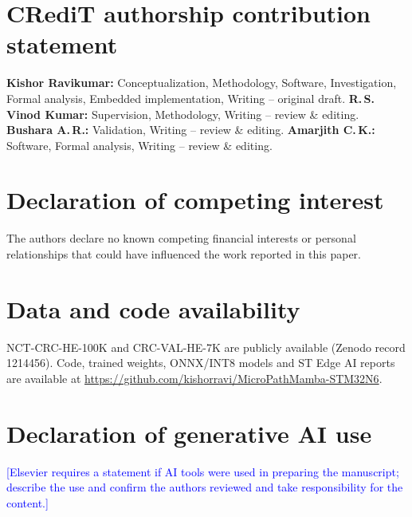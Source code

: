 \documentclass[preprint,12pt]{elsarticle}
\newcommand{\todo}[1]{\textcolor{blue}{[#1]}}
\begin{document}
\section*{CRediT authorship contribution statement}
\textbf{Kishor Ravikumar:} Conceptualization, Methodology, Software, Investigation, Formal analysis, Embedded implementation, Writing -- original draft. \textbf{R.\,S. Vinod Kumar:} Supervision, Methodology, Writing -- review \& editing. \textbf{Bushara A.\,R.:} Validation, Writing -- review \& editing. \textbf{Amarjith C.\,K.:} Software, Formal analysis, Writing -- review \& editing.

\section*{Declaration of competing interest}
The authors declare no known competing financial interests or personal relationships that could have influenced the work reported in this paper.

\section*{Data and code availability}
NCT-CRC-HE-100K and CRC-VAL-HE-7K are publicly available (Zenodo record 1214456). Code, trained weights, ONNX/INT8 models and ST Edge AI reports are available at \url{https://github.com/kishorravi/MicroPathMamba-STM32N6}.

\section*{Declaration of generative AI use}
\todo{Elsevier requires a statement if AI tools were used in preparing the manuscript; describe the use and confirm the authors reviewed and take responsibility for the content.}



\end{document}
